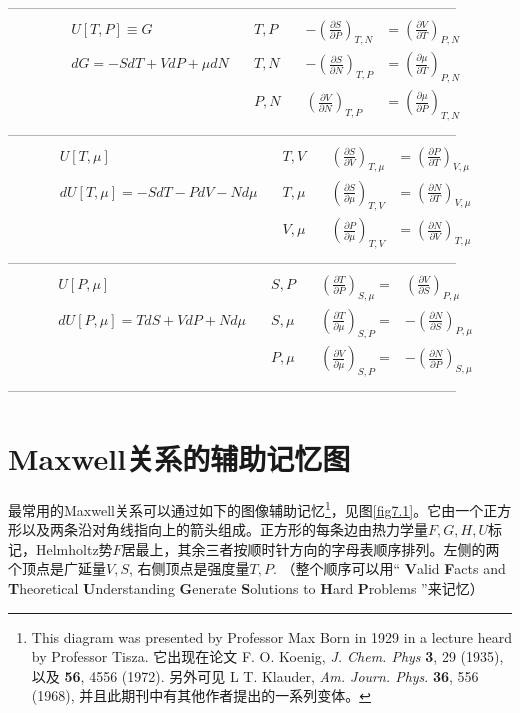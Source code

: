 ————————————————————————————————
\begin{align}
	& U[T, P] \equiv G \quad & T, P \quad & -\left( \frac{\partial S}{\partial P} \right)_{T, N} &= \left( \frac{\partial V}{\partial T} \right)_{P, N} \label{equ7.15} \\
	& dG = -SdT + VdP + \mu dN \quad & T, N \quad & -\left( \frac{\partial S}{\partial N} \right)_{T, P} &= \left( \frac{\partial \mu}{\partial T} \right)_{P, N} \label{equ7.16} \\
	& \phantom{dG = -SdT + VdP + \mu dN \quad} & P, N \quad & \left( \frac{\partial V}{\partial N} \right)_{T, P} &= \left( \frac{\partial \mu}{\partial P} \right)_{T, N} \label{equ7.17}
\end{align}
————————————————————————————————
\begin{align}
	& U[T, \mu] \quad & T, V \quad & \left( \frac{\partial S}{\partial V} \right)_{T, \mu} &= \left( \frac{\partial P}{\partial T} \right)_{V, \mu} \label{equ7.18} \\
	& dU[T, \mu] = -SdT - PdV - Nd\mu \quad & T, \mu \quad & \left( \frac{\partial S}{\partial \mu} \right)_{T, V} &= \left( \frac{\partial N}{\partial T} \right)_{V, \mu} \label{equ7.19} \\
	& \phantom{dU[T, \mu] = -SdT - PdV - Nd\mu \quad} & V, \mu \quad & \left( \frac{\partial P}{\partial \mu} \right)_{T, V} &= \left( \frac{\partial N}{\partial V} \right)_{T, \mu} \label{equ7.20}
\end{align}
————————————————————————————————
\begin{align}
	& U[P, \mu] \quad & S, P \quad & \left( \frac{\partial T}{\partial P} \right)_{S, \mu} =& \left( \frac{\partial V}{\partial S} \right)_{P, \mu} \label{equ7.21} \\
	& dU[P, \mu] = TdS + VdP + Nd\mu \quad & S, \mu \quad & \left( \frac{\partial T}{\partial \mu} \right)_{S, P} =& -\left( \frac{\partial N}{\partial S} \right)_{P, \mu} \label{equ7.22} \\
	& \phantom{ dU[P, \mu] = TdS + VdP + Nd\mu \quad} & P, \mu \quad & \left( \frac{\partial V}{\partial \mu} \right)_{S, P} =& -\left( \frac{\partial N}{\partial P} \right)_{S, \mu} \label{equ7.23}
\end{align}
————————————————————————————————

\section{Maxwell关系的辅助记忆图}
\label{sec7.2}
最常用的Maxwell关系可以通过如下的图像辅助记忆\footnote{This diagram was presented  by  Professor Max Born in  1929  in a lecture heard  by  Professor Tisza. 它出现在论文 F. O. Koenig, {\it J. Chem. Phys} {\bf 3}, 29 (1935),  以及 {\bf 56}, 4556 (1972). 另外可见 L T. Klauder,  {\it Am. Journ. Phys}. {\bf 36}, 556 (1968), 并且此期刊中有其他作者提出的一系列变体。}，见图\ref{fig7.1}。它由一个正方形以及两条沿对角线指向上的箭头组成。正方形的每条边由热力学量$F, G, H, U$标记，Helmholtz势$F$居最上，其余三者按顺时针方向的字母表顺序排列。左侧的两个顶点是广延量$V, S$, 右侧顶点是强度量$T, P$. （整个顺序可以用`` {\bf V}alid {\bf F}acts and {\bf T}heoretical {\bf U}nderstanding {\bf G}enerate {\bf S}olutions to {\bf H}ard {\bf P}roblems ''来记忆）

